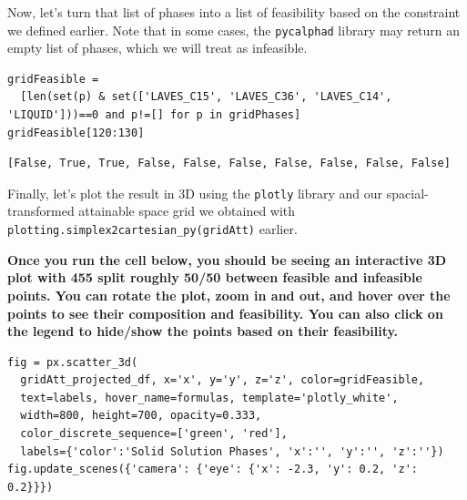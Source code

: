 Now, let's turn that list of phases into a list of feasibility based on
the constraint we defined earlier. Note that in some cases, the
\texttt{pycalphad} library may return an empty list of
phases, which we will treat as infeasible.

\begin{verbatim}
gridFeasible = 
  [len(set(p) & set(['LAVES_C15', 'LAVES_C36', 'LAVES_C14', 'LIQUID']))==0 and p!=[] for p in gridPhases]
gridFeasible[120:130]
\end{verbatim}

\begin{verbatim}
[False, True, True, False, False, False, False, False, False, False]
\end{verbatim}

Finally, let's plot the result in 3D using the
\texttt{plotly} library and our spacial-transformed
attainable space grid we obtained with
\texttt{plotting.simplex2cartesian\_py(gridAtt)}
earlier.

\textbf{Once you run the cell below, you should be seeing an interactive
3D plot with 455 split roughly 50/50 between feasible and infeasible
points. You can rotate the plot, zoom in and out, and hover over the
points to see their composition and feasibility. You can also click on
the legend to hide/show the points based on their feasibility.}

\begin{verbatim}
fig = px.scatter_3d(
  gridAtt_projected_df, x='x', y='y', z='z', color=gridFeasible, 
  text=labels, hover_name=formulas, template='plotly_white', 
  width=800, height=700, opacity=0.333, 
  color_discrete_sequence=['green', 'red'], 
  labels={'color':'Solid Solution Phases', 'x':'', 'y':'', 'z':''})
fig.update_scenes({'camera': {'eye': {'x': -2.3, 'y': 0.2, 'z': 0.2}}})
\end{verbatim}

